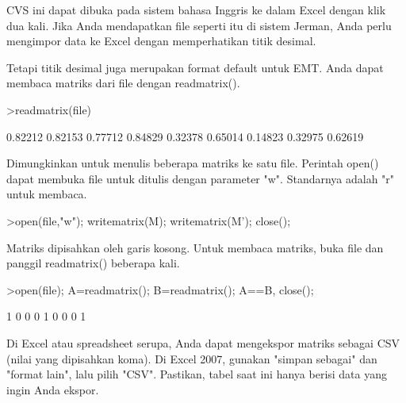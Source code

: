 \documentclass[a4paper,10pt]{article}
\begin{document}
\begin{eulernotebook}
\begin{eulercomment}
\begin{eulercomment}
\begin{eulercomment}
\begin{eulercomment}
\begin{eulercomment}
\begin{eulercomment}
\begin{eulercomment}
\begin{eulercomment}
\begin{eulercomment}
\begin{eulercomment}
\begin{eulercomment}
\begin{eulercomment}
\begin{eulercomment}
\begin{eulercomment}
\begin{eulercomment}
\begin{eulercomment}
\begin{eulercomment}
\begin{eulercomment}
\begin{euleroutput}
\end{euleroutput}
\begin{eulercomment}
CVS ini dapat dibuka pada sistem bahasa Inggris ke dalam Excel dengan
klik dua kali. Jika Anda mendapatkan file seperti itu di sistem
Jerman, Anda perlu mengimpor data ke Excel dengan memperhatikan titik
desimal.

Tetapi titik desimal juga merupakan format default untuk EMT. Anda
dapat membaca matriks dari file dengan readmatrix().
\end{eulercomment}
\begin{eulerprompt}
>readmatrix(file)
\end{eulerprompt}
\begin{euleroutput}
    0.82212   0.82153   0.77712 
    0.84829   0.32378   0.65014 
    0.14823   0.32975   0.62619 
\end{euleroutput}
\begin{eulercomment}
Dimungkinkan untuk menulis beberapa matriks ke satu file. Perintah
open() dapat membuka file untuk ditulis dengan parameter "w".
Standarnya adalah "r" untuk membaca.
\end{eulercomment}
\begin{eulerprompt}
>open(file,"w"); writematrix(M); writematrix(M'); close();
\end{eulerprompt}
\begin{eulercomment}
Matriks dipisahkan oleh garis kosong. Untuk membaca matriks, buka file
dan panggil readmatrix() beberapa kali.
\end{eulercomment}
\begin{eulerprompt}
>open(file); A=readmatrix(); B=readmatrix(); A==B, close();
\end{eulerprompt}
\begin{euleroutput}
          1         0         0 
          0         1         0 
          0         0         1 
\end{euleroutput}
\begin{eulercomment}
Di Excel atau spreadsheet serupa, Anda dapat mengekspor matriks
sebagai CSV (nilai yang dipisahkan koma). Di Excel 2007, gunakan
"simpan sebagai" dan "format lain", lalu pilih "CSV". Pastikan, tabel
saat ini hanya berisi data yang ingin Anda ekspor.


\end{eulercomment}
\end{eulercomment}
\end{eulercomment}
\end{eulercomment}
\end{eulercomment}
\end{eulercomment}
\end{eulercomment}
\end{eulercomment}
\end{eulercomment}
\end{eulercomment}
\end{eulercomment}
\end{eulercomment}
\end{eulercomment}
\end{eulercomment}
\end{eulercomment}
\end{eulercomment}
\end{eulercomment}
\end{eulercomment}
\end{eulercomment}
\end{eulernotebook}
\end{document}
